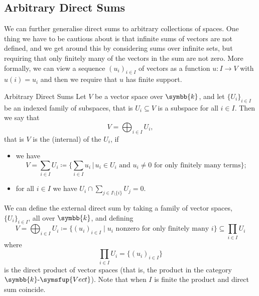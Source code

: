 \documentclass[fleqn]{NotesClass}
\makeatletter
\renewcommand{\field}{\symbb{k}}
\newcommand{\c@egory}[1]{\symsfup{#1}}
\newcommand{\Vect}[1][\field]{#1\text{-}\c@egory{Vect}}
\makeatother
\begin{document}
    \subsection{Arbitrary Direct Sums}
    We can further generalise direct sums to arbitrary collections of spaces.
    One thing we have to be cautious about is that infinite sums of vectors are not defined, and we get around this by considering sums over infinite sets, but requiring that only finitely many of the vectors in the sum are not zero.
    More formally, we can view a sequence \((u_i)_{i \in I}\) of vectors as a function \(u \colon I \to V\) with \(u(i) = u_i\) and then we require that \(u\) has finite support.
    
    \begin{dfn}{Arbitrary Direct Sums}{}
        Let \(V\) be a vector space over \(\field\), and let \(\{U_i\}_{i \in I}\) be an indexed family of subspaces, that is \(U_i \subseteq V\) is a subspace for all \(i \in I\).
        Then we say that
        \begin{equation}
            V = \bigoplus_{i \in I} U_i,
        \end{equation}
        that is \(V\) is the (internal)  of the \(U_i\), if
        \begin{itemize}
            \item we have
            \begin{equation*}
                V = \sum_{i\in I} U_i \coloneq \bigg\{ \sum_{i \in I} u_i \,\bigg\vert\, u_i \in U_i \text{ and } u_i \ne 0 \text{ for only finitely many terms}\bigg\};
            \end{equation*}
            \item for all \(i \in I\) we have \(U_i \cap \sum_{j \in I \setminus \{i\}} U_j = 0\).
        \end{itemize}
    \end{dfn}
    
    We can define the external direct sum by taking a family of vector spaces, \(\{U_i\}_{i \in I}\), all over \(\field\), and defining
    \begin{equation}
        V = \bigoplus_{i \in I} U_i \coloneqq \{(u_i)_{i \in I} \mid u_i \text{ nonzero for only finitely many } i\} \subseteq \prod_{i \in I} U_i
    \end{equation}
    where
    \begin{equation}
        \prod_{i \in I} U_i = \{(u_i)_{i \in I}\}
    \end{equation}
    is the direct product of vector spaces (that is, the product in the category \(\Vect\)).
    Note that when \(I\) is finite the product and direct sum coincide.
    
\end{document}
